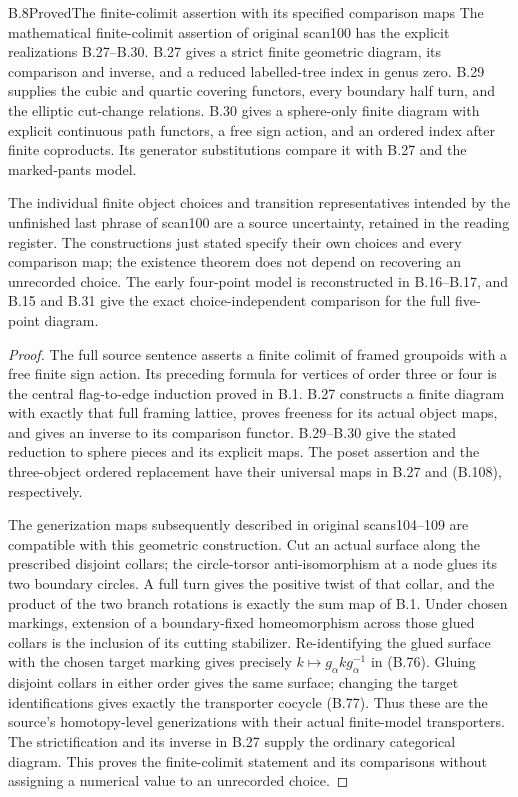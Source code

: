 \begin{result}{B.8}{Proved}{The finite-colimit assertion with its specified comparison maps}
The mathematical finite-colimit assertion of original scan100 has
the explicit realizations B.27--B.30.  B.27 gives a strict finite
geometric diagram, its comparison and inverse, and a reduced
labelled-tree index in genus zero.  B.29 supplies the cubic and
quartic covering functors, every boundary half turn, and the
elliptic cut-change relations.  B.30 gives a sphere-only finite
diagram with explicit continuous path functors, a free sign action,
and an ordered index after finite coproducts.  Its generator
substitutions compare it with B.27 and the marked-pants model.

The individual finite object choices and transition representatives
intended by the unfinished last phrase of scan100 are a source
uncertainty, retained in the reading register.  The constructions
just stated specify their own choices and every comparison map;
the existence theorem does not depend on recovering an unrecorded
choice.  The early four-point model is reconstructed in B.16--B.17,
and B.15 and B.31 give the exact choice-independent comparison for
the full five-point diagram.
\end{result}
\begin{proof}
The full source sentence asserts a finite colimit of framed
groupoids with a free finite sign action.  Its preceding formula
for vertices of order three or four is the central flag-to-edge
induction proved in B.1.  B.27 constructs a finite diagram with
exactly that full framing lattice, proves freeness for its actual
object maps, and gives an inverse to its comparison functor.
B.29--B.30 give the stated reduction to sphere pieces and its
explicit maps.  The poset assertion and the three-object
ordered replacement have their universal maps in B.27 and
(B.108), respectively.

The generization maps subsequently described in original
scans104--109 are compatible with this geometric construction.
Cut an actual surface along the prescribed disjoint collars;
the circle-torsor anti-isomorphism at a node glues its two
boundary circles.  A full turn gives the positive twist of
that collar, and the product of the two branch rotations is
exactly the sum map of B.1.  Under chosen markings, extension
of a boundary-fixed homeomorphism across those glued collars
is the inclusion of its cutting stabilizer.  Re-identifying
the glued surface with the chosen target marking gives
precisely $k\mapsto g_\alpha k g_\alpha^{-1}$ in (B.76).
Gluing disjoint collars in either order gives the same surface;
changing the target identifications gives exactly the
transporter cocycle (B.77).  Thus these are the source's
homotopy-level generizations with their actual finite-model
transporters.  The strictification and its inverse in B.27
supply the ordinary categorical diagram.  This proves the
finite-colimit statement and its comparisons without assigning
a numerical value to an unrecorded choice.
\end{proof}
